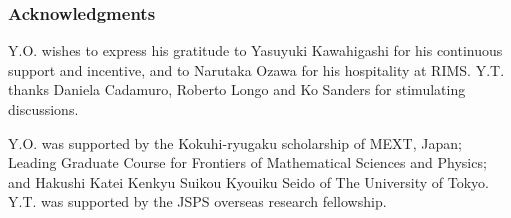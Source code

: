 \documentclass[a4paper,12pt]{article}
\theoremstyle{plain}
\theoremstyle{definition}
\theoremstyle{remark}
\begin{document}

\subsubsection*{Acknowledgments}
Y.O.\!  wishes to express his gratitude to Yasuyuki Kawahigashi for his continuous support and incentive, and to Narutaka Ozawa for his hospitality at RIMS.
Y.T.\! thanks Daniela Cadamuro, Roberto Longo and Ko Sanders for stimulating discussions.

Y.O.\! was supported by the Kokuhi-ryugaku scholarship of MEXT, Japan; Leading Graduate Course for Frontiers of Mathematical Sciences and Physics; and Hakushi Katei Kenkyu Suikou Kyouiku Seido of The University of Tokyo.
Y.T.\! was supported by the JSPS overseas research fellowship.

{\small

}
\end{document}
